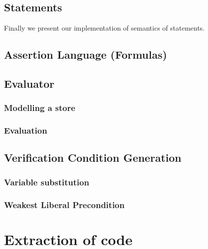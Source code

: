\subsection{Statements}
Finally we present our implementation of semantics of statements.



\subsection{Assertion Language (Formulas)}\label{sec:iformulas}


\subsection{Evaluator}\label{sec:evaluator}


\subsubsection{Modelling a store}\label{sec:model}


\subsubsection{Evaluation}


\subsection{Verification Condition Generation}\label{sec:vcg}


\subsubsection{Variable substitution}


\subsubsection{Weakest Liberal Precondition}\label{sec:impwlp}


\section{Extraction of code}\label{sec:extract}

